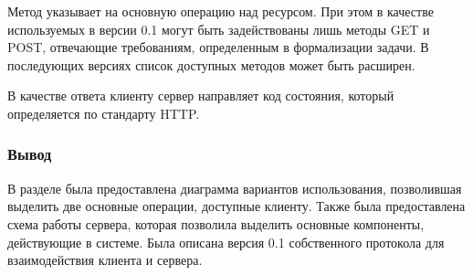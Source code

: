 Метод указывает на основную операцию над ресурсом. При этом в качестве используемых в версии 0.1 могут быть задействованы лишь методы GET и POST, отвечающие требованиям, определенным в формализации задачи. В последующих версиях список доступных методов может быть расширен.

В качестве ответа клиенту сервер направляет код состояния, который определяется по стандарту HTTP.

\subsubsection*{Вывод}
В разделе была предоставлена диаграмма вариантов использования, позволившая выделить две основные операции, доступные клиенту. Также была предоставлена схема работы сервера, которая позволила выделить основные компоненты, действующие в системе. Была описана версия 0.1 собственного протокола для взаимодействия клиента и сервера.

\pagebreak